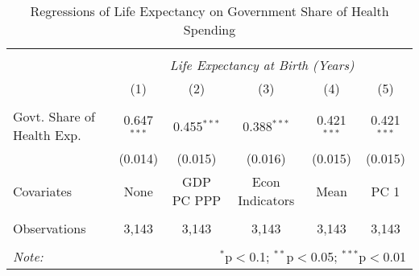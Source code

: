\begin{table}[!htbp] \centering
  \caption{Regressions of Life Expectancy on Government Share of Health Spending \label{main_regs}}
\begin{tabular}{@{\extracolsep{5pt}}lccccc}
\\[-1.8ex]\hline
\hline \\[-1.8ex]
& \multicolumn{5}{c}{\textit{Life Expectancy at Birth (Years)}} \
\cr \
\\[-1.8ex] & (1) & (2) & (3) & (4) & (5) \\
\hline \\[-1.8ex]
 Govt. Share of Health Exp. & 0.647$^{***}$ & 0.455$^{***}$ & 0.388$^{***}$ & 0.421$^{***}$ & 0.421$^{***}$ \\
  & (0.014) & (0.015) & (0.016) & (0.015) & (0.015) \\
 Covariates & None & GDP PC PPP & Econ Indicators & Mean & PC 1 \\
\hline \\[-1.8ex]
 Observations & 3,143 & 3,143 & 3,143 & 3,143 & 3,143 \\
\hline
\hline \\[-1.8ex]
\textit{Note:} & \multicolumn{5}{r}{$^{*}$p$<$0.1; $^{**}$p$<$0.05; $^{***}$p$<$0.01} \\
\end{tabular}
\end{table}